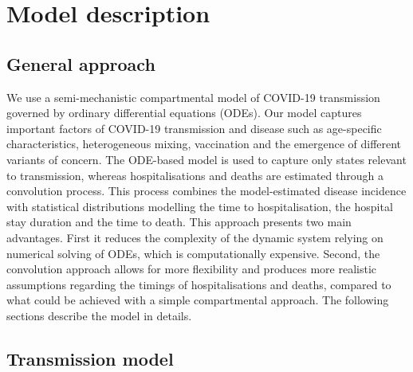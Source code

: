 
\section{Model description}

\subsection{General approach}
We use a semi-mechanistic compartmental model of COVID-19 transmission governed by ordinary differential equations (ODEs). 
Our model captures important factors of COVID-19 transmission and disease such as age-specific characteristics, 
heterogeneous mixing, vaccination and the emergence of different variants of concern. 
The ODE-based model is used to capture only states relevant to transmission, whereas hospitalisations and deaths are
estimated through a convolution process. This process combines the model-estimated disease incidence with 
statistical distributions modelling the time to hospitalisation, the hospital stay duration and the time to death.
This approach presents two main advantages. First it reduces the complexity of the dynamic system relying on 
numerical solving of ODEs, which is computationally expensive. Second, the convolution approach allows for more flexibility 
and produces more realistic assumptions regarding the timings of hospitalisations and deaths, 
compared to what could be achieved with a simple compartmental approach. The following sections describe the model in details.


\subsection{Transmission model}
\label{trans} 
